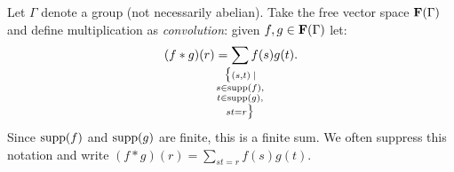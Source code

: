     \begin{example}
        Let $\Gamma$ denote a group (not necessarily abelian). Take the free vector space $\mathbf{F}(\Gamma)$ and define multiplication as \textit{convolution}: given $f,g \in \mathbf{F}(\Gamma)$ let:
            \begin{equation*}
            \begin{split}
                (f \ast g)(r) = \sum_{
                    \mathclap{\substack{\bigl\{ (s,t) \hspace{2pt} \mid \\ s \in \supp(f), \\ t \in \supp(g), \\ st = r \bigr\}}}} f(s)g(t).
            \end{split}
            \end{equation*}
        Since $\operatorname{supp}(f)$ and $\operatorname{supp}(g)$ are finite, this is a finite sum. We often suppress this notation and write $(f \ast g)(r) = \sum_{st = r}f(s)g(t)$.


\end{example}

